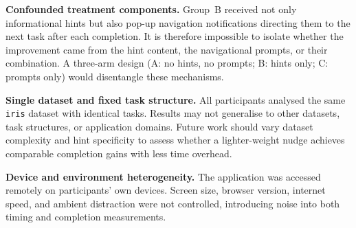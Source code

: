 \documentclass[11pt, a4paper]{article}
\begin{document}
\textbf{Confounded treatment components.}
Group~B received not only informational hints but also pop-up navigation
notifications directing them to the next task after each completion. It is therefore
impossible to isolate whether the improvement came from the hint content, the
navigational prompts, or their combination. A three-arm design
(A: no hints, no prompts; B: hints only; C: prompts only) would disentangle these
mechanisms.

\textbf{Single dataset and fixed task structure.}
All participants analysed the same \texttt{iris} dataset with identical tasks.
Results may not generalise to other datasets, task structures, or application
domains. Future work should vary dataset complexity and hint specificity to assess
whether a lighter-weight nudge achieves comparable completion gains with less time
overhead.

\textbf{Device and environment heterogeneity.}
The application was accessed remotely on participants' own devices. Screen size,
browser version, internet speed, and ambient distraction were not controlled,
introducing noise into both timing and completion measurements.

% 
% 
\end{document}
